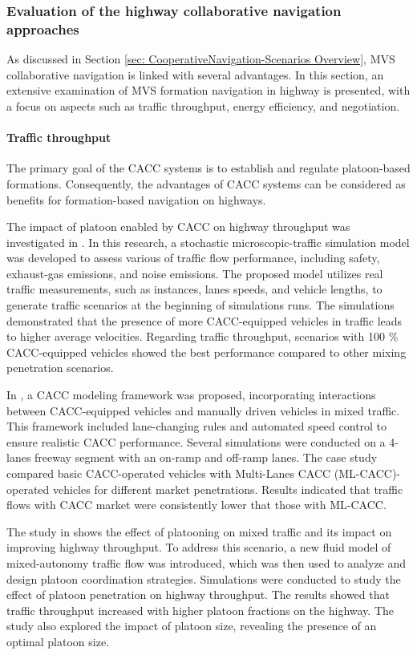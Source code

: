 \subsubsection{Evaluation of the highway collaborative navigation approaches}
As discussed in Section \ref{sec: CooperativeNavigation-Scenarios Overview}, MVS collaborative navigation is linked with several advantages. In this section, an extensive examination of MVS formation navigation in highway is presented, with a focus on aspects such as traffic throughput, energy efficiency, and negotiation.

\paragraph{Traffic throughput} \label{sec: highway_Traffic_throughput}

The primary goal of the CACC systems is to establish and regulate platoon-based formations. Consequently, the advantages of CACC systems can be considered as benefits for formation-based navigation on highways. 

The impact of platoon enabled by CACC on highway throughput was investigated in \cite{van2006impact}. In this research, a stochastic microscopic-traffic simulation model was developed to assess various of traffic flow performance, including safety, exhaust-gas emissions, and noise emissions. The proposed model utilizes real traffic measurements, such as instances, lanes speeds, and vehicle lengths, to generate traffic scenarios at the beginning of simulations runs. The simulations demonstrated that the presence of more CACC-equipped vehicles in traffic leads to higher average velocities. Regarding traffic throughput, scenarios with 100 \% CACC-equipped vehicles showed the best performance compared to other mixing penetration scenarios. 

In \cite{liu2018modeling}, a CACC modeling framework was proposed, incorporating interactions between CACC-equipped vehicles and manually driven vehicles in mixed traffic. This framework included lane-changing rules and automated speed control to ensure realistic CACC performance. Several simulations were conducted on a 4-lanes freeway segment with an on-ramp and off-ramp lanes. The case study compared basic CACC-operated vehicles with Multi-Lanes CACC (ML-CACC)-operated vehicles for different market penetrations. Results indicated that traffic flows with CACC market were consistently lower that those with ML-CACC. 

The study in \cite{jin2020analysis} shows the effect of platooning on mixed traffic and its impact on improving highway throughput. To address this scenario, a new fluid model of mixed-autonomy traffic flow was introduced, which was then used to analyze and design platoon coordination strategies. Simulations were conducted to study the effect of platoon penetration on highway throughput. The results showed that traffic throughput increased with higher platoon fractions on the highway. The study also explored the impact of platoon size, revealing the presence of an optimal platoon size. 


